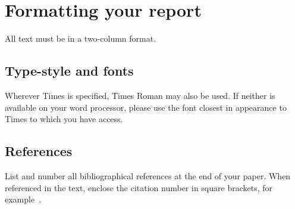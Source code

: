 \documentclass[10pt,twocolumn,letterpaper]{article}
\begin{document}
\section{Formatting your report}

All text must be in a two-column format. 

\subsection{Type-style and fonts}

Wherever Times is specified, Times Roman may also be used. If neither is
available on your word processor, please use the font closest in
appearance to Times to which you have access.


\subsection{References}

List and number all bibliographical references at the end of your paper. 
When referenced in the text,
enclose the citation number in square brackets, for
example~\cite{Authors14}. 



{\small


}
\end{document}
